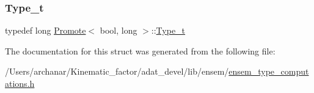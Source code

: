 \subsubsection{\texorpdfstring{Type\_t}{Type\_t}\hspace{0.1cm}{\footnotesize\ttfamily [2/2]}}
{\footnotesize\ttfamily typedef long \mbox{\hyperlink{structPromote}{Promote}}$<$ bool, long $>$\+::\mbox{\hyperlink{structPromote_3_01bool_00_01long_01_4_acd7afc9445455e248d40955c9a61e0d3}{Type\+\_\+t}}}



The documentation for this struct was generated from the following file\+:\begin{DoxyCompactItemize}
\item 
/\+Users/archanar/\+Kinematic\+\_\+factor/adat\+\_\+devel/lib/ensem/\mbox{\hyperlink{lib_2ensem_2ensem__type__computations_8h}{ensem\+\_\+type\+\_\+computations.\+h}}\end{DoxyCompactItemize}
